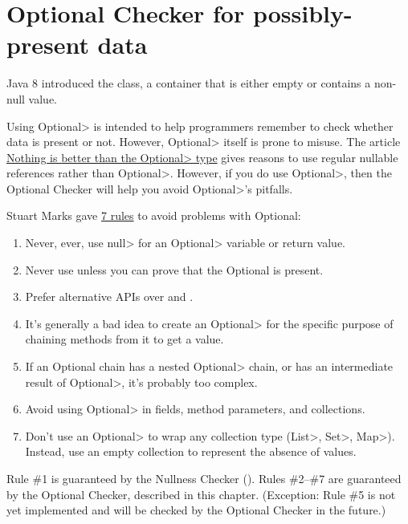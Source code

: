 \htmlhr
\chapter{Optional Checker for possibly-present data\label{optional-checker}}

Java 8 introduced the 
class, a container that is either empty or contains a non-null value.

Using \<Optional> is intended to help programmers remember to check whether
data is present or not.  However, \<Optional> itself is prone to misuse.
The article
\href{https://homes.cs.washington.edu/~mernst/advice/nothing-is-better-than-optional.html}{Nothing
  is better than the \<Optional> type} gives reasons to use
regular nullable references rather than \<Optional>.  However, if you do use
\<Optional>, then the Optional Checker will help you avoid
\<Optional>'s pitfalls.

Stuart Marks gave
\href{https://stuartmarks.wordpress.com/2016/09/27/vjug24-session-on-optional/}{7
  rules} to avoid problems with Optional:
\begin{enumerate}
\item
  Never, ever, use \<null> for an \<Optional> variable or return value.
\item
  Never use  unless you can prove that the Optional is present.
\item
  Prefer alternative APIs over
  and .
\item
  It's generally a bad idea to create an \<Optional> for the specific
  purpose of chaining methods from it to get a value.
\item
  If an Optional chain has a nested \<Optional> chain, or has an
  intermediate result of \<Optional>, it's probably too complex.
\item
  Avoid using \<Optional> in fields, method parameters, and collections.
\item
  Don't use an \<Optional> to wrap any collection type (\<List>, \<Set>,
  \<Map>).  Instead, use an empty collection to represent the absence of
  values.
\end{enumerate}

Rule \#1 is guaranteed by the Nullness Checker
().
Rules \#2--\#7 are guaranteed by the Optional Checker, described in this chapter.
(Exception:  Rule \#5 is not yet implemented and will be checked by the
Optional Checker in the future.)


